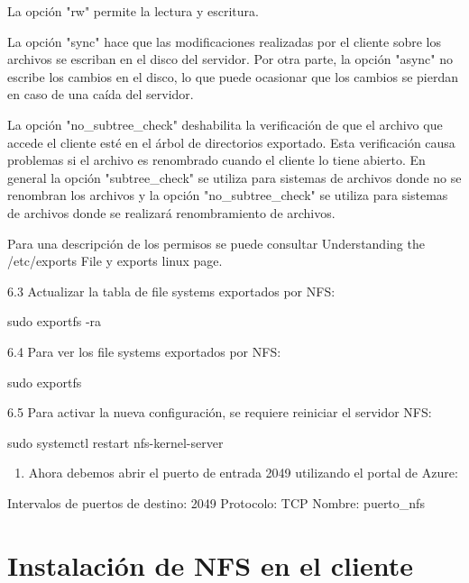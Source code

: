La opción "rw" permite la lectura y escritura.

La opción "sync" hace que las modificaciones realizadas por el cliente sobre los archivos se escriban en el disco del servidor. Por otra parte, la opción "async" no escribe los cambios en el disco, lo que puede ocasionar que los cambios se pierdan en caso de una caída del servidor.

\begin{SourceCode}
La opción "no_subtree_check" deshabilita la verificación de que el archivo que accede el cliente esté en el árbol de directorios exportado. Esta verificación causa problemas si el archivo es renombrado cuando el cliente lo tiene abierto. En general la opción "subtree_check" se utiliza para sistemas de archivos donde no se renombran los archivos y la opción "no_subtree_check" se utiliza para sistemas de archivos donde se realizará renombramiento de archivos.
\end{SourceCode}

Para una descripción de los permisos se puede consultar Understanding the /etc/exports File y exports linux page.

6.3 Actualizar la tabla de file systems exportados por NFS:

\begin{SourceCode}
sudo exportfs -ra
\end{SourceCode}

6.4 Para ver los file systems exportados por NFS:

\begin{SourceCode}
sudo exportfs
\end{SourceCode}

6.5 Para activar la nueva configuración, se requiere reiniciar el servidor NFS:

\begin{SourceCode}
sudo systemctl restart nfs-kernel-server
\end{SourceCode}

\begin{enumerate}
\item Ahora debemos abrir el puerto de entrada 2049 utilizando el portal de Azure:
\end{enumerate}

\begin{SourceCode}
Intervalos de puertos de destino: 2049
Protocolo: TCP
Nombre: puerto_nfs
\end{SourceCode}

\section{Instalación de NFS en el cliente}

